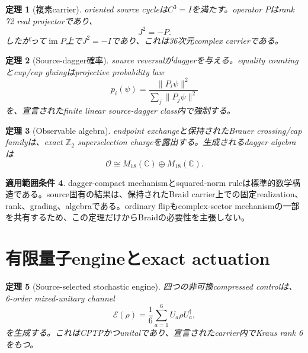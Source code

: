 \documentclass[11pt]{article}
\newtheorem{theorem}{定理}[section]
\theoremstyle{definition}
\newtheorem{scope}[theorem]{適用範囲条件}
\theoremstyle{remark}
\newcommand{\cO}{\mathcal O}
\begin{document}
\begin{theorem}[複素carrier]
oriented source cycleは$C^3=I$を満たす。operator $P$はrank 72 real projectorであり、
\begin{equation}
J^2=-P.
\end{equation}
したがって$\operatorname{im}P$上で$J^2=-I$であり、これは36次元complex carrierである。
\end{theorem}

\begin{theorem}[Source-dagger確率]
source reversalがdaggerを与える。equality countingとcup/cap gluingはprojective probability law
\begin{equation}
p_i(\psi)=\frac{\|P_i\psi\|^2}{\sum_j\|P_j\psi\|^2}
\label{eq:born}
\end{equation}
を、宣言されたfinite linear source-dagger class内で強制する。
\end{theorem}

\begin{theorem}[Observable algebra]
endpoint exchangeと保持されたBrauer crossing/cap familyは、exact $\mathbb Z_2$ superselection chargeを露出する。生成されるdagger algebraは
\begin{equation}
\cO\cong M_{18}(\mathbb C)\oplus M_{18}(\mathbb C).
\label{eq:observablealgebra}
\end{equation}
\end{theorem}

\begin{scope}
dagger-compact mechanismとsquared-norm ruleは標準的数学構造である。source固有の結果は、保持されたBraid carrier上での固定realization、rank、grading、algebraである。ordinary flipもcomplex-sector mechanismの一部を共有するため、この定理だけからBraidの必要性を主張しない。
\end{scope}

\section{有限量子engineとexact actuation}

\begin{theorem}[Source-selected stochastic engine]
四つの非可換compressed controlは、6-order mixed-unitary channel
\begin{equation}
\mathcal E(\rho)=\frac16\sum_{a=1}^{6}U_a\rho U_a^\dagger,
\end{equation}
を生成する。これはCPTPかつunitalであり、宣言されたcarrier内でKraus rank 6をもつ。
\end{theorem}
\end{document}
